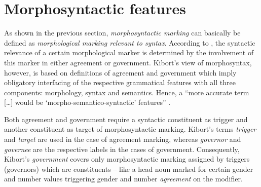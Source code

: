 
\section{Morphosyntactic features} \label{crit eval}
As shown in the previous section, \emph{morphosyntactic marking} can basically be defined as \emph{morphological marking relevant to syntax}. According to \cite{kibort2010a}, the syntactic relevance of a certain morphological marker is determined by the involvement of this marker in either agreement or government. Kibort's view of morphosyntax, however, is based on definitions of {agreement} and {government} which imply obligatory interfacing of the respective grammatical features with all three components: morphology, syntax and semantics. Hence, a “more accurate term [\dots] would be ‘morpho-semantico-syntactic’ features” \citep[??]{kibort2010a}.

Both agreement and government require a syntactic constituent as trigger and another constituent as target of morphosyntactic marking. Kibort's terms \emph{trigger} and \emph{target} are used in the case of agreement marking, whereas \emph{governor} and \emph{governee} are the respective labels in the cases of government. Consequently, Kibort's \emph{government} covers only morphosyntactic marking assigned by triggers (governors) which are constituents – like a head noun marked for certain gender and number values triggering gender and number \emph{agreement} on the modifier.

